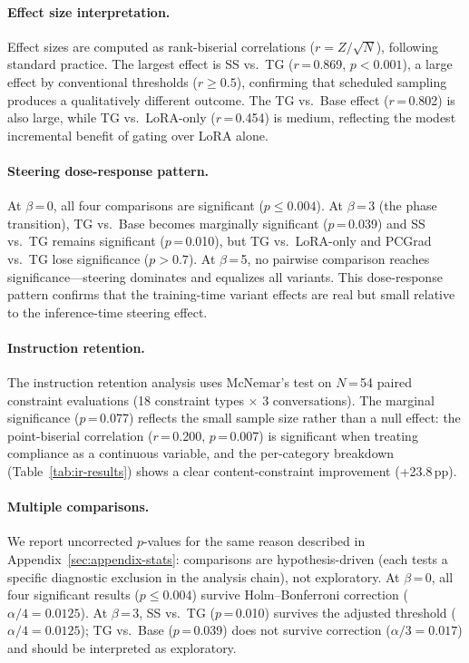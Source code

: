 \paragraph{Effect size interpretation.} Effect sizes are computed as rank-biserial correlations ($r = Z / \sqrt{N}$), following standard practice. The largest effect is SS vs.\ TG ($r$\,=\,0.869, $p < 0.001$), a large effect by conventional thresholds ($r \geq 0.5$), confirming that scheduled sampling produces a qualitatively different outcome. The TG vs.\ Base effect ($r$\,=\,0.802) is also large, while TG vs.\ LoRA-only ($r$\,=\,0.454) is medium, reflecting the modest incremental benefit of gating over LoRA alone.

\paragraph{Steering dose-response pattern.} At $\beta$\,=\,0, all four comparisons are significant ($p \leq 0.004$). At $\beta$\,=\,3 (the phase transition), TG vs.\ Base becomes marginally significant ($p$\,=\,0.039) and SS vs.\ TG remains significant ($p$\,=\,0.010), but TG vs.\ LoRA-only and PCGrad vs.\ TG lose significance ($p > 0.7$). At $\beta$\,=\,5, no pairwise comparison reaches significance---steering dominates and equalizes all variants. This dose-response pattern confirms that the training-time variant effects are real but small relative to the inference-time steering effect.

\paragraph{Instruction retention.} The instruction retention analysis uses McNemar's test on $N$\,=\,54 paired constraint evaluations (18 constraint types $\times$ 3 conversations). The marginal significance ($p$\,=\,0.077) reflects the small sample size rather than a null effect: the point-biserial correlation ($r$\,=\,0.200, $p$\,=\,0.007) is significant when treating compliance as a continuous variable, and the per-category breakdown (Table~\ref{tab:ir-results}) shows a clear content-constraint improvement (+23.8\,pp).

\paragraph{Multiple comparisons.} We report uncorrected $p$-values for the same reason described in Appendix~\ref{sec:appendix-stats}: comparisons are hypothesis-driven (each tests a specific diagnostic exclusion in the analysis chain), not exploratory. At $\beta$\,=\,0, all four significant results ($p \leq 0.004$) survive Holm--Bonferroni correction ($\alpha/4 = 0.0125$). At $\beta$\,=\,3, SS vs.\ TG ($p$\,=\,0.010) survives the adjusted threshold ($\alpha/4 = 0.0125$); TG vs.\ Base ($p$\,=\,0.039) does not survive correction ($\alpha/3 = 0.017$) and should be interpreted as exploratory.

